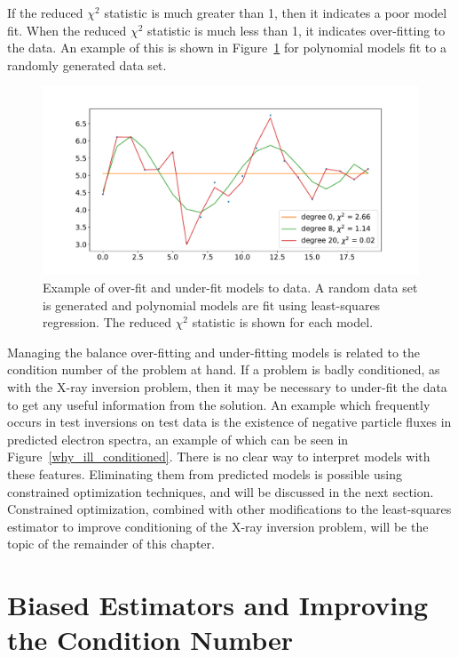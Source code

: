 If the reduced $\chi^2$ statistic is much greater than 1, then it indicates a poor model fit. When the  reduced $\chi^2$ statistic is much less than 1, it indicates over-fitting to the data. An example of this is shown in Figure~\ref{overunderfit_example} for polynomial models fit to a randomly generated data set.

\begin{figure}[p]
    \centering
    \includegraphics[width=1.0\textwidth]{figures/fig_4.pdf}
    \caption{Example of over-fit and under-fit models to data. A random data set is generated and polynomial models are fit using least-squares regression. The reduced $\chi^2$ statistic is shown for each model.}
    \label{overunderfit_example}
\end{figure}

Managing the balance over-fitting and under-fitting models is related to the condition number of the problem at hand. If a problem is badly conditioned, as with the X-ray inversion problem, then it may be necessary to under-fit the data to get any useful information from the solution. An example which frequently occurs in test inversions on test data is the existence of negative particle fluxes in predicted electron spectra, an example of which can be seen in Figure~\ref{why_ill_conditioned}. There is no clear way to interpret models with these features. Eliminating them from predicted models is possible using constrained optimization techniques, and will be discussed in the next section. Constrained optimization, combined with other modifications to the least-squares estimator to improve conditioning of the X-ray inversion problem, will be the topic of the remainder of this chapter. 

\section{Biased Estimators and Improving the Condition Number}

